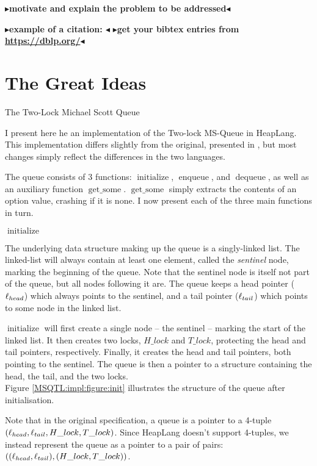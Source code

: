 \documentclass[twoside,11pt,openright]{report}
\newcommand{\initialise}{\operatorname{initialize}}
\newcommand{\enqueue}{\operatorname{enqueue}}
\newcommand{\dequeue}{\operatorname{dequeue}}
\newcommand{\getsome}{\operatorname{get\_some}}
\newcommand{\todo}[1]{{\color[rgb]{.5,0,0}\textbf{$\blacktriangleright$#1$\blacktriangleleft$}}}
\begin{document}
\todo{motivate and explain the problem to be addressed}

\todo{example of a citation: \cite{DBLP:conf/podc/MichaelS96}}
\todo{get your bibtex entries from \url{https://dblp.org/}}


\chapter{The Great Ideas}
\label{ch:main}

The Two-Lock Michael Scott Queue

I present here he an implementation of the Two-lock MS-Queue in HeapLang. This implementation differs slightly from the original, presented in \cite{DBLP:conf/podc/MichaelS96}, but most changes simply reflect the differences in the two languages.

The queue consists of 3 functions: $\initialise$, $\enqueue$, and $\dequeue$, as well as an auxiliary function $\getsome$. $\getsome$ simply extracts the contents of an option value, crashing if it is none. I now present each of the three main functions in turn.


$\initialise$

The underlying data structure making up the queue is a singly-linked list. The linked-list will always contain at least one element, called the \emph{sentinel} node, marking the beginning of the queue. Note that the sentinel node is itself not part of the queue, but all nodes following it are. The queue keeps a head pointer ($\ell_{head}$) which always points to the sentinel, and a tail pointer ($\ell_{tail}$) which points to some node in the linked list.

$\initialise$ will first create a single node -- the sentinel -- marking the start of the linked list. It then creates two locks, $H\_lock$ and $T\_lock$, protecting the head and tail pointers, respectively. Finally, it creates the head and tail pointers, both pointing to the sentinel. The queue is then a pointer to a structure containing the head, the tail, and the two locks.\\
Figure \ref{MSQTL:impl:figure:init} illustrates the structure of the queue after initialisation.

Note that in the original specification, a queue is a pointer to a 4-tuple $(\ell_{head}, \ell_{tail}, H\_lock, T\_lock)$. Since HeapLang doesn't support 4-tuples, we instead represent the queue as a pointer to a pair of pairs: $((\ell_{head}, \ell_{tail}), (H\_lock, T\_lock))$.
\end{document}

